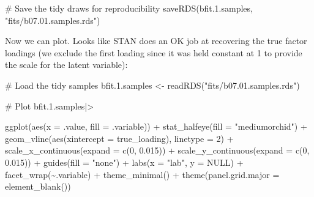 \documentclass[
  letterpaper,
  DIV=11,
  numbers=noendperiod]{scrreprt}
\newenvironment{Shaded}{\begin{snugshade}}{\end{snugshade}}
\newcommand{\AttributeTok}[1]{\textcolor[rgb]{0.40,0.45,0.13}{#1}}
\newcommand{\CommentTok}[1]{\textcolor[rgb]{0.37,0.37,0.37}{#1}}
\newcommand{\ConstantTok}[1]{\textcolor[rgb]{0.56,0.35,0.01}{#1}}
\newcommand{\DecValTok}[1]{\textcolor[rgb]{0.68,0.00,0.00}{#1}}
\newcommand{\FloatTok}[1]{\textcolor[rgb]{0.68,0.00,0.00}{#1}}
\newcommand{\FunctionTok}[1]{\textcolor[rgb]{0.28,0.35,0.67}{#1}}
\newcommand{\NormalTok}[1]{\textcolor[rgb]{0.00,0.23,0.31}{#1}}
\newcommand{\OtherTok}[1]{\textcolor[rgb]{0.00,0.23,0.31}{#1}}
\newcommand{\SpecialCharTok}[1]{\textcolor[rgb]{0.37,0.37,0.37}{#1}}
\newcommand{\StringTok}[1]{\textcolor[rgb]{0.13,0.47,0.30}{#1}}
\begin{document}
\begin{Shaded}
\begin{Highlighting}[]
\CommentTok{\# Save the tidy draws for reproducibility}
\FunctionTok{saveRDS}\NormalTok{(bfit.}\FloatTok{1.}\NormalTok{samples, }\StringTok{"fits/b07.01.samples.rds"}\NormalTok{)}
\end{Highlighting}
\end{Shaded}

Now we can plot. Looks like STAN does an OK job at recovering the true
factor loadings (we exclude the first loading since it was held constant
at 1 to provide the scale for the latent variable):

\begin{Shaded}
\begin{Highlighting}[]
\CommentTok{\# Load the tidy samples}
\NormalTok{bfit.}\FloatTok{1.}\NormalTok{samples }\OtherTok{\textless{}{-}} \FunctionTok{readRDS}\NormalTok{(}\StringTok{"fits/b07.01.samples.rds"}\NormalTok{)}

\CommentTok{\# Plot}
\NormalTok{bfit.}\FloatTok{1.}\NormalTok{samples}\SpecialCharTok{|\textgreater{}}

  \FunctionTok{ggplot}\NormalTok{(}\FunctionTok{aes}\NormalTok{(}\AttributeTok{x =}\NormalTok{ .value, }\AttributeTok{fill =}\NormalTok{ .variable)) }\SpecialCharTok{+}
    \FunctionTok{stat\_halfeye}\NormalTok{(}\AttributeTok{fill =} \StringTok{"mediumorchid"}\NormalTok{) }\SpecialCharTok{+}
    \FunctionTok{geom\_vline}\NormalTok{(}\FunctionTok{aes}\NormalTok{(}\AttributeTok{xintercept =}\NormalTok{ true\_loading), }\AttributeTok{linetype =} \DecValTok{2}\NormalTok{) }\SpecialCharTok{+} 
    \FunctionTok{scale\_x\_continuous}\NormalTok{(}\AttributeTok{expand =} \FunctionTok{c}\NormalTok{(}\DecValTok{0}\NormalTok{, }\FloatTok{0.015}\NormalTok{)) }\SpecialCharTok{+}
    \FunctionTok{scale\_y\_continuous}\NormalTok{(}\AttributeTok{expand =} \FunctionTok{c}\NormalTok{(}\DecValTok{0}\NormalTok{, }\FloatTok{0.015}\NormalTok{)) }\SpecialCharTok{+}
    \FunctionTok{guides}\NormalTok{(}\AttributeTok{fill =} \StringTok{"none"}\NormalTok{) }\SpecialCharTok{+}
    \FunctionTok{labs}\NormalTok{(}\AttributeTok{x =} \StringTok{"lab"}\NormalTok{,}
       \AttributeTok{y =} \ConstantTok{NULL}\NormalTok{)  }\SpecialCharTok{+}
    \FunctionTok{facet\_wrap}\NormalTok{(}\SpecialCharTok{\textasciitilde{}}\NormalTok{.variable) }\SpecialCharTok{+}
    \FunctionTok{theme\_minimal}\NormalTok{() }\SpecialCharTok{+} 
    \FunctionTok{theme}\NormalTok{(}\AttributeTok{panel.grid.major =} \FunctionTok{element\_blank}\NormalTok{())}
\end{Highlighting}
\end{Shaded}
\end{document}
